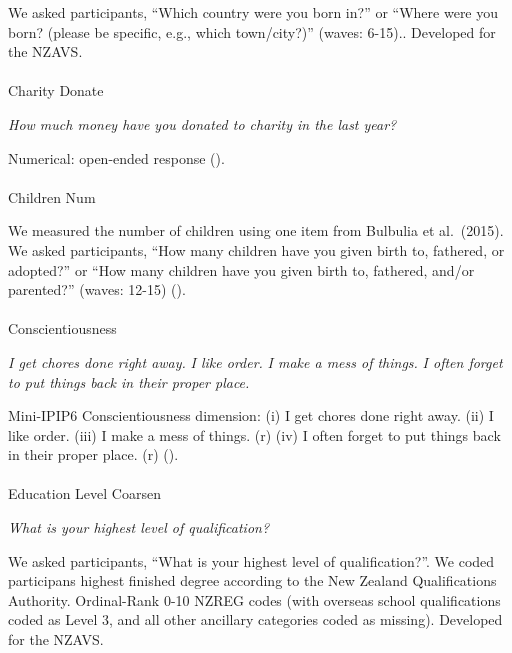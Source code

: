 \documentclass[
  single column]{article}
\makeatletter
\let\oldparagraph\paragraph
\renewcommand{\paragraph}{
    \@ifstar
      \xxxParagraphStar
      \xxxParagraphNoStar
  }
\newcommand{\xxxParagraphStar}[1]{\oldparagraph*{#1}\mbox{}}
\newcommand{\xxxParagraphNoStar}[1]{\oldparagraph{#1}\mbox{}}
\makeatother
\begin{document}
We asked participants, ``Which country were you born in?'' or ``Where
were you born? (please be specific, e.g., which town/city?)'' (waves:
6-15).. Developed for the NZAVS.

\paragraph{Charity Donate}\label{charity-donate}

\emph{How much money have you donated to charity in the last year?}

Numerical: open-ended response
().

\paragraph{Children Num}\label{children-num}

We measured the number of children using one item from Bulbulia et
al.~(2015). We asked participants, ``How many children have you given
birth to, fathered, or adopted?'' or ``How many children have you given
birth to, fathered, and/or parented?'' (waves: 12-15)
().

\paragraph{Conscientiousness}\label{conscientiousness}

\emph{I get chores done right away.} \emph{I like order.} \emph{I make a
mess of things.} \emph{I often forget to put things back in their proper
place.}

Mini-IPIP6 Conscientiousness dimension: (i) I get chores done right
away. (ii) I like order. (iii) I make a mess of things. (r) (iv) I often
forget to put things back in their proper place. (r)
().

\paragraph{Education Level Coarsen}\label{education-level-coarsen}

\emph{What is your highest level of qualification?}

We asked participants, ``What is your highest level of qualification?''.
We coded participans highest finished degree according to the New
Zealand Qualifications Authority. Ordinal-Rank 0-10 NZREG codes (with
overseas school qualifications coded as Level 3, and all other ancillary
categories coded as missing). Developed for the NZAVS.
\end{document}
